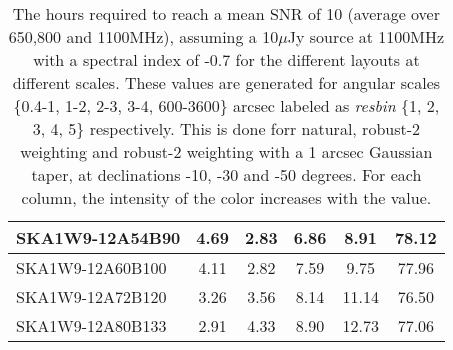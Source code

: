 \begin{table}[H]
{{\begin{tabular}{|lccccc|}
SKA1W9-12A54B90 & 4.69 \cellcolor{blue!60.00} & 2.83 \cellcolor{red!18.10} & 6.86 \cellcolor{green!18.00} & 8.91 \cellcolor{orange!18.00} & 78.12 \cellcolor{purple!60.00}\\ \hline 
SKA1W9-12A60B100 & 4.11 \cellcolor{blue!46.31} & 2.82 \cellcolor{red!18.00} & 7.59 \cellcolor{green!28.25} & 9.75 \cellcolor{orange!27.24} & 77.96 \cellcolor{purple!59.00}\\ \hline 
SKA1W9-12A72B120 & 3.26 \cellcolor{blue!26.26} & 3.56 \cellcolor{red!25.16} & 8.14 \cellcolor{green!35.98} & 11.14 \cellcolor{orange!42.52} & 76.50 \cellcolor{purple!49.92}\\ \hline 
SKA1W9-12A80B133 & 2.91 \cellcolor{blue!18.00} & 4.33 \cellcolor{red!32.61} & 8.90 \cellcolor{green!46.66} & 12.73 \cellcolor{orange!60.00} & 77.06 \cellcolor{purple!53.40}\\ \hline 
\end{tabular}}
\vspace{0.000000cm}
\hspace{1cm} 
\vspace{0.000000cm}
\hspace{1cm} 

\vspace{.50cm}
\caption{The hours required to reach a mean SNR of 10 (average over 650,800 and 1100MHz), assuming a 10$\mu$Jy source at 1100MHz with a spectral index of -0.7 for the different layouts at different scales. These values are generated for angular scales \{0.4-1, 1-2, 2-3, 3-4, 600-3600\} arcsec labeled as {\it resbin} \{1, 2, 3, 4, 5\} respectively. This is done forr natural, robust-2 weighting and robust-2 weighting with a 1 arcsec Gaussian taper, at declinations -10, -30 and -50 degrees. For each column, the intensity of the color increases with the value.}\label{tab:hours}}
 \end{table}
